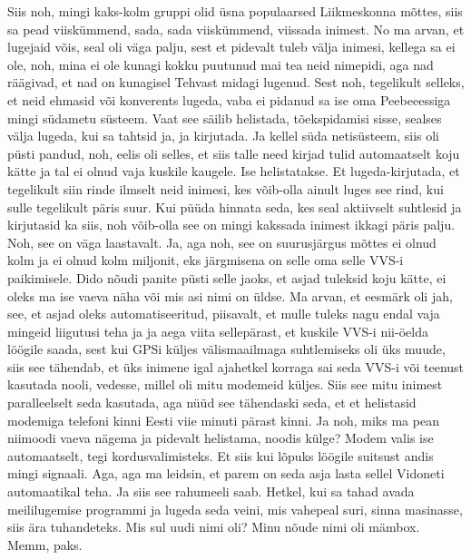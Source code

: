 Siis noh, mingi kaks-kolm gruppi olid üsna populaarsed
Liikmeskonna mõttes, siis sa pead viiskümmend, sada, sada viiskümmend, viissada inimest. No ma arvan, et lugejaid võis, seal oli väga palju, sest et pidevalt tuleb välja inimesi, kellega sa ei ole, noh, mina ei ole kunagi kokku puutunud mai tea neid nimepidi, aga nad räägivad, et nad on kunagisel Tehvast midagi lugenud. Sest noh, tegelikult selleks, et neid ehmasid või konverents lugeda, vaba ei pidanud sa ise oma Peebeeessiga mingi südametu süsteem. Vaat see säilib helistada, tõekspidamisi sisse, sealses välja lugeda, kui sa tahtsid ja, ja kirjutada. Ja kellel süda netisüsteem, siis oli püsti pandud, noh, eelis oli selles, et siis talle need kirjad tulid automaatselt koju kätte ja tal ei olnud vaja kuskile kaugele. Ise helistatakse. Et lugeda-kirjutada, et tegelikult siin rinde ilmselt neid inimesi, kes võib-olla ainult luges see rind, kui sulle tegelikult päris suur. Kui püüda hinnata seda, kes seal aktiivselt suhtlesid ja kirjutasid ka siis, noh võib-olla see on mingi kakssada inimest ikkagi päris palju. Noh, see on väga laastavalt.
Ja, aga noh, see on suurusjärgus mõttes ei olnud kolm ja ei olnud kolm miljonit, eks järgmisena on selle oma selle VVS-i paikimisele. Dido nõudi panite püsti selle jaoks, et asjad tuleksid koju kätte, ei oleks ma ise vaeva näha või mis asi nimi on üldse.
Ma arvan, et eesmärk oli jah, see, et asjad oleks automatiseeritud, piisavalt, et mulle tuleks nagu endal vaja mingeid liigutusi teha ja ja aega viita sellepärast, et kuskile VVS-i nii-öelda löögile saada, sest kui GPSi küljes välismaailmaga suhtlemiseks oli üks muude, siis see tähendab, et üks inimene igal ajahetkel korraga sai seda VVS-i või teenust kasutada nooli, vedesse, millel oli mitu modemeid küljes.
Siis see mitu inimest paralleelselt seda kasutada, aga nüüd see tähendaski seda, et et helistasid modemiga telefoni kinni Eesti viie minuti pärast kinni. Ja noh, miks ma pean niimoodi vaeva nägema ja pidevalt helistama, noodis külge? Modem valis ise automaatselt, tegi kordusvalimisteks. Et siis kui lõpuks löögile suitsust andis mingi signaali. Aga, aga ma leidsin, et parem on seda asja lasta sellel Vidoneti automaatikal teha. Ja siis see rahumeeli saab. Hetkel, kui sa tahad avada meililugemise programmi ja lugeda seda veini, mis vahepeal suri, sinna masinasse, siis ära tuhandeteks. Mis sul uudi nimi oli? Minu nõude nimi oli mämbox. Memm, paks.
